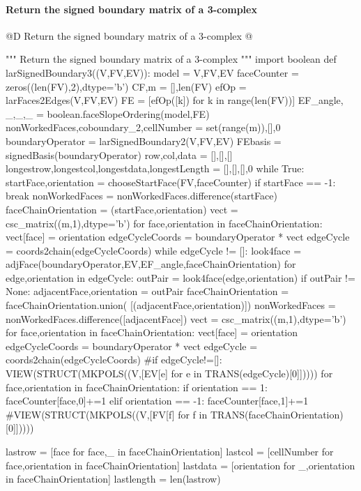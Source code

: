 \documentclass[11pt,oneside]{article}    %
\begin{document}
\paragraph{Return the signed boundary matrix of a 3-complex}
@D Return the signed boundary matrix of a 3-complex
@{""" Return the signed boundary matrix of a 3-complex """
import boolean
def larSignedBoundary3((V,FV,EV)):
    model = V,FV,EV
    faceCounter = zeros((len(FV),2),dtype='b')
    CF,m = [],len(FV)
    efOp = larFaces2Edges(V,FV,EV)
    FE = [efOp([k]) for k in range(len(FV))]
    EF_angle, _,_,_ = boolean.faceSlopeOrdering(model,FE)
    nonWorkedFaces,coboundary_2,cellNumber = set(range(m)),[],0
    boundaryOperator = larSignedBoundary2(V,FV,EV)
    FEbasis = signedBasis(boundaryOperator)
    row,col,data = [],[],[]
    longestrow,longestcol,longestdata,longestLength = [],[],[],0
    while True:
        startFace,orientation = chooseStartFace(FV,faceCounter)
        if startFace == -1: break
        nonWorkedFaces = nonWorkedFaces.difference({startFace})
        faceChainOrientation = {(startFace,orientation)}
        vect = csc_matrix((m,1),dtype='b')
        for face,orientation in faceChainOrientation:  
            vect[face] = orientation
        edgeCycleCoords = boundaryOperator * vect
        edgeCycle = coords2chain(edgeCycleCoords)
        while edgeCycle != []:
            look4face = adjFace(boundaryOperator,EV,EF_angle,faceChainOrientation)
            for edge,orientation in edgeCycle:
                outPair = look4face(edge,orientation)
                if outPair != None:
                    adjacentFace,orientation = outPair
                    faceChainOrientation = faceChainOrientation.union(
                        [(adjacentFace,orientation)])
                    nonWorkedFaces = nonWorkedFaces.difference([adjacentFace])
            vect = csc_matrix((m,1),dtype='b')
            for face,orientation in faceChainOrientation:  
                vect[face] = orientation
            edgeCycleCoords = boundaryOperator * vect
            edgeCycle = coords2chain(edgeCycleCoords)
            #if edgeCycle!=[]: VIEW(STRUCT(MKPOLS((V,[EV[e] for e in TRANS(edgeCycle)[0]]))))
        for face,orientation in faceChainOrientation:
            if orientation == 1: faceCounter[face,0]+=1
            elif orientation == -1: faceCounter[face,1]+=1
        #VIEW(STRUCT(MKPOLS((V,[FV[f] for f in TRANS(faceChainOrientation)[0]]))))
        
        lastrow = [face for face,_ in faceChainOrientation]
        lastcol = [cellNumber for face,orientation in faceChainOrientation]
        lastdata = [orientation for _,orientation in faceChainOrientation]
        lastlength = len(lastrow)
                
}
\end{document}
